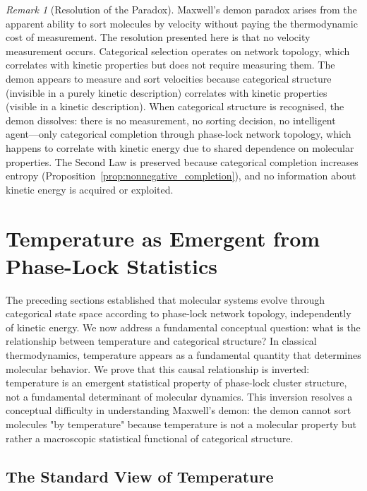 \documentclass[12pt,a4paper]{article}
\theoremstyle{definition}
\theoremstyle{remark}
\newtheorem{remark}[theorem]{Remark}
\begin{document}
\begin{remark}[Resolution of the Paradox]
\label{rem:paradox_resolution}
Maxwell's demon paradox arises from the apparent ability to sort molecules by velocity without paying the thermodynamic cost of measurement. The resolution presented here is that no velocity measurement occurs. Categorical selection operates on network topology, which correlates with kinetic properties but does not require measuring them. The demon appears to measure and sort velocities because categorical structure (invisible in a purely kinetic description) correlates with kinetic properties (visible in a kinetic description). When categorical structure is recognised, the demon dissolves: there is no measurement, no sorting decision, no intelligent agent—only categorical completion through phase-lock network topology, which happens to correlate with kinetic energy due to shared dependence on molecular properties. The Second Law is preserved because categorical completion increases entropy (Proposition~\ref{prop:nonnegative_completion}), and no information about kinetic energy is acquired or exploited.
\end{remark}

\section{Temperature as Emergent from Phase-Lock Statistics}
\label{sec:temperature}

The preceding sections established that molecular systems evolve through categorical state space according to phase-lock network topology, independently of kinetic energy. We now address a fundamental conceptual question: what is the relationship between temperature and categorical structure? In classical thermodynamics, temperature appears as a fundamental quantity that determines molecular behavior. We prove that this causal relationship is inverted: temperature is an emergent statistical property of phase-lock cluster structure, not a fundamental determinant of molecular dynamics. This inversion resolves a conceptual difficulty in understanding Maxwell's demon: the demon cannot sort molecules "by temperature" because temperature is not a molecular property but rather a macroscopic statistical functional of categorical structure.

\subsection{The Standard View of Temperature}
\end{document}
